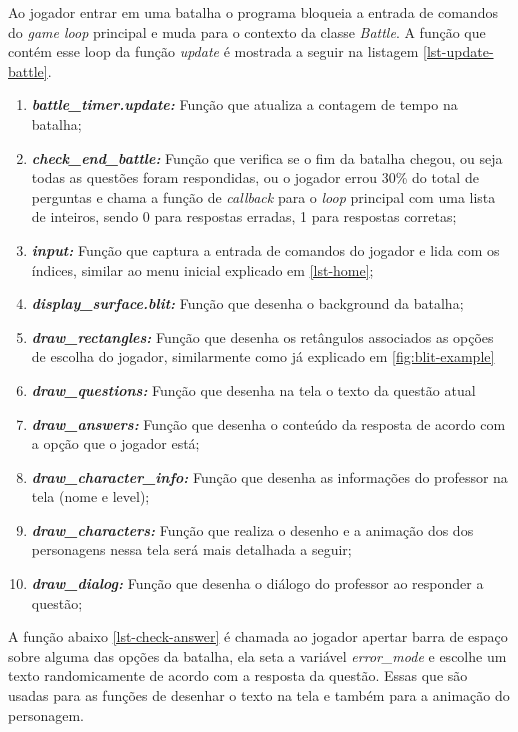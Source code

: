 \clearpage
Ao jogador entrar em uma batalha o programa bloqueia a entrada de comandos do \textit{game loop} principal e muda para o contexto da classe \textit{Battle}. A função que contém esse loop da função \textit{update} é mostrada a seguir na listagem \ref{lst-update-battle}.

\begin{enumerate}
    \item \textit{\textbf{battle\_timer.update:}} Função que atualiza a contagem de tempo na batalha;
    \item \textbf{\textit{check\_end\_battle:}} Função que verifica se o fim da batalha chegou, ou seja todas as questões foram respondidas, ou o jogador errou 30\% do total de perguntas e chama a função de \textit{callback} para o \textit{loop} principal com uma lista de inteiros, sendo 0 para respostas erradas, 1 para respostas corretas;
    \item \textbf{\textit{input: }} Função que captura a entrada de comandos do jogador e lida com os índices, similar ao menu inicial explicado em \ref{lst-home};
    \item \textbf{\textit{display\_surface.blit:}} Função que desenha o background da batalha;
    \item \textbf{\textit{draw\_rectangles:}} Função que desenha os retângulos associados as opções de escolha do jogador, similarmente como já explicado em \ref{fig:blit-example}
    \item \textbf{\textit{draw\_questions:}} Função que desenha na tela o texto da questão atual
    \item \textbf{\textit{draw\_answers:}} Função que desenha o conteúdo da resposta de acordo com a opção que o jogador está;
    \item \textbf{\textit{draw\_character\_info:}} Função que desenha as informações do professor na tela (nome e level);
    \item \textbf{\textit{draw\_characters:}} Função que realiza o desenho e a animação dos dos personagens nessa tela será mais detalhada a seguir;
    \item \textbf{\textit{draw\_dialog:}} Função que desenha o diálogo do professor ao responder a questão;
\end{enumerate}

A função abaixo \ref{lst-check-answer} é chamada ao jogador apertar barra de espaço sobre alguma das opções da batalha, ela seta a variável \textit{error\_mode} e escolhe um texto randomicamente de acordo com a resposta da questão. Essas que são usadas para as funções de desenhar o texto na tela e também para a animação do personagem.



